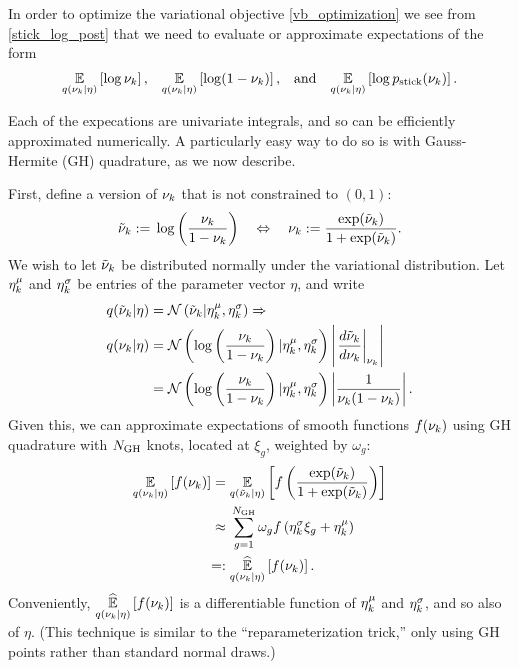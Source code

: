 In order to optimize the variational objective \eqref{vb_optimization} we see
from \eqref{stick_log_post} that we need to evaluate or approximate expectations
of the form
%
\begin{align*}
%
\expect{\q(\nu_\k \vert \eta)}{\log \nu_\k}
\textrm{,}\quad
\expect{\q(\nu_\k \vert \eta)}{\log (1 - \nu_\k)}
\textrm{,}\quad\textrm{and}\quad
\expect{\q(\nu_\k \vert \eta)}{\log \pstick(\nu_\k)}.
%
\end{align*}

Each of the expecations are univariate integrals, and so can be efficiently
approximated numerically.  A particularly easy way to do so is with
Gauss-Hermite (GH) quadrature, as we now describe.

First, define a version of $\nu_k$ that is not constrained to $(0,1)$:
%
\begin{align*}
%
\lnu_\k :={} \log \left( \frac{\nu_\k}{1 - \nu_\k} \right)
\quad\Leftrightarrow\quad
\nu_\k :={} \frac{\exp(\lnu_\k)}{1 + \exp(\lnu_\k)}.
%
\end{align*}
%
We wish to let $\tilde{\nu}_k$ be distributed normally under the variational
distribution.  Let $\eta^{\mu}_k$ and $\eta^{\sigma}_k$ be entries of the parameter
vector $\eta$, and write
%
\begin{align*}
%
\q(\lnu_\k \vert \eta) ={}& \norm{\lnu_\k \vert \lnumean_\k, \lnusd_\k}
\Rightarrow \\
\q(\nu_\k \vert \eta) ={}&
    \norm{\log \left( \frac{\nu_\k}{1 - \nu_\k} \right)
        \vert \lnumean_\k, \lnusd_\k}
    \left|\fracat{d \lnu_\k}{ d\nu_\k}{\nu_\k}\right|
\\={}&
\norm{\log \left( \frac{\nu_\k}{1 - \nu_\k} \right)
        \vert \lnumean_\k, \lnusd_\k}
    \left|\frac{1}{\nu_\k (1 - \nu_\k)}\right|.
%
\end{align*}
%
Given this, we can approximate expectations of smooth functions
$f(\nu_k)$ using GH quadrature with $N_{\mathrm{GH}}$ knots,
located at $\xi_g$, weighted by $\omega_g$:
%
\begin{align*}
%
\expect{\q(\nu_\k \vert \eta)}{f(\nu_\k)} ={}&
\expect{\q(\lnu_\k \vert \eta)}
       {f\left(\frac{\exp(\lnu_\k)}{1 + \exp(\lnu_\k)}\right)}
\\\approx{}&
    \sum_{g=1}^{\ngh} \omega_g f\left(\lnusd_\k \xi_{g} + \lnumean_\k\right)
 \\=:{}&
\expecthat{\q(\nu_\k \vert \eta)}{f(\nu_\k)}.
%
\end{align*}
%
Conveniently, $\underset{q(\nu_k \vert \eta)}{\widehat{\mathbb{E}}}\left[f(\nu_k)\right]$ is a differentiable
function of $\eta^{\mu}_k$ and $\eta^{\sigma}_k$, and so also of $\eta$.  (This
technique is similar to the ``reparameterization trick,'' only using
GH points rather than standard normal draws.)

